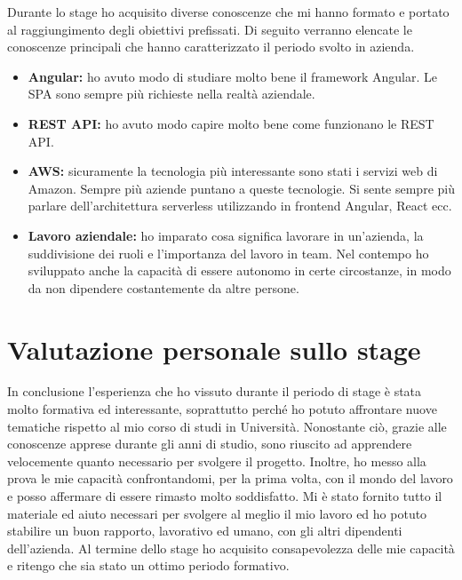 	Durante lo stage ho acquisito diverse conoscenze che mi hanno formato
e portato al raggiungimento degli obiettivi prefissati. Di seguito verranno
elencate le conoscenze principali che hanno caratterizzato il periodo svolto
in azienda.
\begin{itemize}
	\item \textbf{Angular:} ho avuto modo di studiare molto bene il framework Angular. Le SPA sono sempre più richieste nella realtà aziendale. 
	\item \textbf{REST API:} ho avuto modo capire molto bene come funzionano le REST API. 
	\item \textbf{AWS:} sicuramente la tecnologia più interessante sono stati i servizi web di Amazon. Sempre più aziende puntano a queste tecnologie. Si sente sempre più parlare dell'architettura serverless utilizzando in frontend Angular, React ecc.
	\item \textbf{Lavoro aziendale:}  ho imparato cosa significa lavorare in un’azienda,
	la suddivisione dei ruoli e l’importanza del lavoro in team. Nel
	contempo ho sviluppato anche la capacità di essere autonomo in certe
	circostanze, in modo da non dipendere costantemente da altre persone.
\end{itemize}
\section{Valutazione personale sullo stage}
In conclusione l’esperienza che ho vissuto durante il periodo di stage è stata
molto formativa ed interessante, soprattutto perché ho potuto affrontare
nuove tematiche rispetto al mio corso di studi in Università. Nonostante
ciò, grazie alle conoscenze apprese durante gli anni di studio, sono riuscito ad
apprendere velocemente quanto necessario per svolgere il progetto. Inoltre,
ho messo alla prova le mie capacità confrontandomi, per la prima volta, con
il mondo del lavoro e posso affermare di essere rimasto molto soddisfatto. Mi è stato fornito tutto il materiale ed
aiuto necessari per svolgere al meglio il mio lavoro ed ho potuto stabilire un
buon rapporto, lavorativo ed umano, con gli altri dipendenti dell’azienda. Al
termine dello stage ho acquisito consapevolezza delle mie capacità e ritengo
che sia stato un ottimo periodo formativo.
